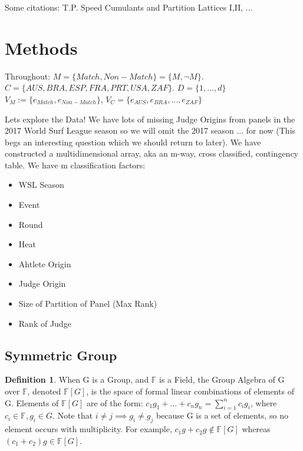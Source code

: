 \documentclass{article}
\theoremstyle{definition}
\newtheorem{definition}{Definition}
\begin{document}
Some citations:
T.P. Speed Cumulants and Partition Lattices I,II, ...



\section{Methods}
Throughout:
$M = \{Match,Non-Match\} = \{M,\neg M\}$. $C = \{AUS,BRA,ESP,FRA,PRT,USA,ZAF\}$. $D = \{1,\dots,d\}$
$V_M := \{e_{Match},e_{Non-Match}\} $, $V_C = \{ e_{AUS},e_{BRA},\dots,e_{ZAF} \}$

Lets explore the Data!
We have lots of missing Judge Origins from panels in the 2017 World Surf League season so we will omit the 2017 season ... for now (This begs an interesting question which we should return to later). We have constructed a multidimensional array, aka an m-way, cross classified, contingency table. We have m classification factors:
\begin{itemize}
\item WSL Season
\item Event
\item Round
\item Heat
\item Ahtlete Origin
\item Judge Origin
\item Size of Partition of Panel (Max Rank)
\item Rank of Judge
\end{itemize}


\subsection{Symmetric Group}
\begin{definition}When G is a Group, and $\mathbb{F}$ is a Field, the Group Algebra of G over $\mathbb{F}$, denoted $\mathbb{F}[G]$, is the space of formal linear combinations of elements of G. Elements of $\mathbb{F}[G]$ are of the form: $c_1 g_1 + \dots + c_n g_n = \sum^n_{i=1} c_i g_i$, where $c_i \in \mathbb{F}, g_i \in G$. Note that $i\neq j \implies g_i \neq g_j$ because G is a set of elements, so no element occurs with multiplicity. For example, $c_1 g + c_2 g \not\in \mathbb{F}[G]$ whereas $(c_1 + c_2)g \in \mathbb{F}[G]. $\end{definition}
\end{document}
